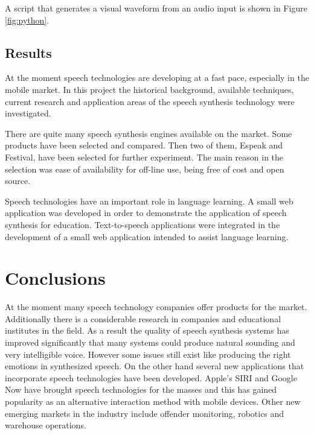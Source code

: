 \documentclass[11pt,a4paper,oneside,article]{memoir}
\begin{document}
A script that generates a visual waveform from an audio input is shown in Figure \vref{fig:python}.
\section{Results }
At the moment speech technologies are developing at a fast pace, especially in the mobile market. In this project the historical background, available techniques, current research and application areas of the speech synthesis technology were investigated.

There are quite many speech synthesis engines available on the market. Some products have been selected and compared. Then  two of them, Espeak and Festival, have been selected for further experiment. The main reason in the selection was ease of availability for off-line use, being free of cost and open source. 

Speech technologies have an important role in language learning. A small web application was developed in order to demonstrate the application of speech synthesis for education. Text-to-speech applications were integrated in the development of a small web application intended to assist language learning.

\clearpage
\chapter{Conclusions}
At the moment many speech technology companies offer products for the market. Additionally there is a considerable research in companies and educational institutes in the field. As a result the quality of speech synthesis systems has improved significantly that many systems could produce natural sounding and very intelligible voice. However some issues still exist like producing the right emotions in synthesized speech. On the other hand several new applications that incorporate speech technologies have been developed. Apple's SIRI and Google Now have brought speech technologies for the masses and this has gained popularity as an alternative interaction method with mobile devices. Other new emerging markets in the industry include offender monitoring, robotics and warehouse operations.
\end{document}
